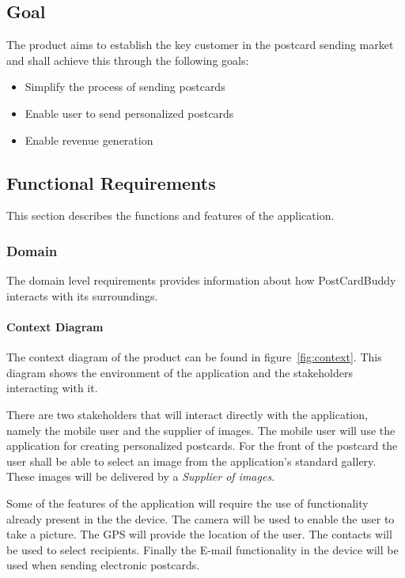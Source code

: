 \documentclass[10pt,a4paper]{article}
\begin{document}
\subsection{Goal}
The product aims to establish the key customer in the postcard sending market and shall achieve this through the following goals:

\begin{itemize}
\item Simplify the process of sending postcards
\item Enable user to send personalized postcards
\item Enable revenue generation
\end{itemize}

\subsection{Functional Requirements}
This section describes the functions and features of the application.

\subsubsection{Domain}
The domain level requirements provides information about how PostCardBuddy interacts with its surroundings. 

\paragraph{Context Diagram}
The context diagram of the product can be found in figure~\ref{fig:context}. This diagram shows the environment of the application and the stakeholders interacting with it.

There are two stakeholders that will interact directly with the application, namely the mobile user and the supplier of images. The mobile user will use the application for creating personalized postcards. For the front of the postcard the user shall be able to select an image from the application's standard gallery. These images will be delivered by a \textit{Supplier of images}.

 Some of the features of the application will require the use of functionality already present in the the device. The camera will be used to enable the user to take a picture. The GPS will provide the location of the user. The contacts will be used to select recipients. Finally the E-mail functionality in the device will be used when sending electronic postcards.
 
\end{document}
